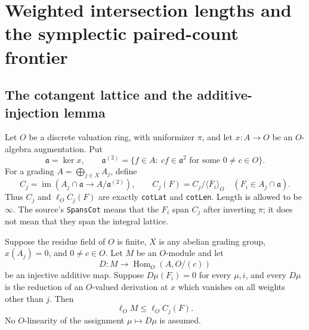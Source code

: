 \section{Weighted intersection lengths and the symplectic paired-count frontier}
\label{sec:symplectic-count-closure}


\subsection{The cotangent lattice and the additive-injection lemma}

Let $O$ be a discrete valuation ring, with uniformizer $\pi$, and let
$x:A\to O$ be an $O$-algebra augmentation.  Put
\[
 \mathfrak a=\ker x,\qquad
 \mathfrak a^{(2)}=\{f\in A:\ cf\in\mathfrak a^2
                         \text{ for some }0\ne c\in O\}.
 \tag{SP.1}
\]
For a grading $A=\bigoplus_{j\in X}A_j$, define
\[
 C_j=\operatorname{im}(A_j\cap\mathfrak a\longrightarrow
                          A/\mathfrak a^{(2)}),\qquad
 C_j(F)=C_j/\langle\overline F_i\rangle_O
 \quad(F_i\in A_j\cap\mathfrak a).
 \tag{SP.2}
\]
Thus $C_j$ and $\ell_O C_j(F)$ are exactly \texttt{cotLat} and
\texttt{cotLen}.  Length is allowed to be $\infty$.
The source's \texttt{SpansCot} means that the $F_i$ span $C_j$ after
inverting $\pi$; it does not mean that they span the integral lattice.

\begin{proposition}
\label{claim:SP1}
Suppose the residue field of $O$ is finite, $X$ is any abelian grading
group, $x(A_j)=0$, and $0\ne c\in O$.  Let $M$ be an $O$-module and
let
\[
 D:M\longrightarrow\operatorname{Hom}_O(A,O/(c))
 \tag{SP.3}
\]
be an injective additive map.  Suppose $D\mu(F_i)=0$ for every $\mu,i$,
and every $D\mu$ is the reduction of an $O$-valued derivation at $x$
which vanishes on all weights other than $j$.  Then
\[
                    \ell_O M\le\ell_O C_j(F).
 \tag{SP.4}
\]
No $O$-linearity of the assignment $\mu\mapsto D\mu$ is assumed.
\end{proposition}

